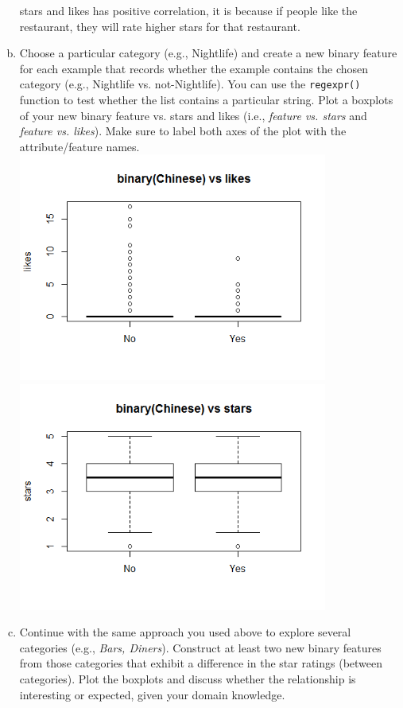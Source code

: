 \documentclass[11pt]{article}
\begin{document}
\begin{enumerate}[(a)]
stars and likes has positive correlation, it is because if people like the restaurant, they will rate higher stars for that restaurant.
\item  
Choose a particular category (e.g., Nightlife) and create a new binary feature for each example that records whether the example contains the chosen category (e.g., Nightlife vs. not-Nightlife). You can use the \texttt{regexpr()} function to test whether the list contains a particular string. Plot a boxplots of your new binary feature vs. stars and likes (i.e., {\em feature vs. stars} and {\em feature vs. likes}).
Make sure to label both axes of the plot with the attribute/feature names.\\
\includegraphics[width=4in]{boxplot_likes.png}\\
\includegraphics[width=4in]{boxplot_stars.png}
\item 
Continue with the same approach you used above to explore several categories (e.g., {\em Bars, Diners}).  Construct at least two new binary features from those categories  that exhibit a difference in the star ratings (between categories). Plot the boxplots and discuss whether the relationship is interesting or expected, given your domain knowledge.\\

\end{enumerate}
\end{document}
